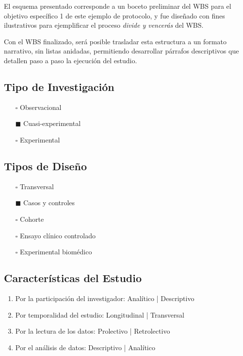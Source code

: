 \documentclass[12pt,letterpaper,spanish, twoside]{article}
\begin{document}
El esquema presentado corresponde a un boceto preliminar del WBS para el objetivo específico 1 de este ejemplo de protocolo, y fue diseñado con fines ilustrativos para ejemplificar el proceso \textit{divide y vencerás} del WBS.

Con el WBS finalizado, será posible trasladar esta estructura a un formato narrativo, sin listas anidadas, permitiendo desarrollar párrafos descriptivos que detallen paso a paso la ejecución del estudio.


\subsection{Tipo de Investigación}
\begin{itemize}
    \item[$\square$] Observacional
    \item[$\blacksquare$] Cuasi-experimental
    \item[$\square$] Experimental
\end{itemize}

\subsection{Tipos de Diseño}
\begin{itemize}
    \item[$\square$] Transversal
    \item[$\blacksquare$] Casos y controles
    \item[$\square$] Cohorte
    \item[$\square$] Ensayo clínico controlado
    \item[$\square$] Experimental biomédico
\end{itemize}

\subsection{Características del Estudio}
\begin{enumerate}
 \item Por la participación del investigador: Analítico | Descriptivo
 \item Por temporalidad del estudio: Longitudinal | Transversal
 \item Por la lectura de los datos: Prolectivo | Retrolectivo
 \item Por el análisis de datos: Descriptivo | Analítico
\end{enumerate}
\end{document}
